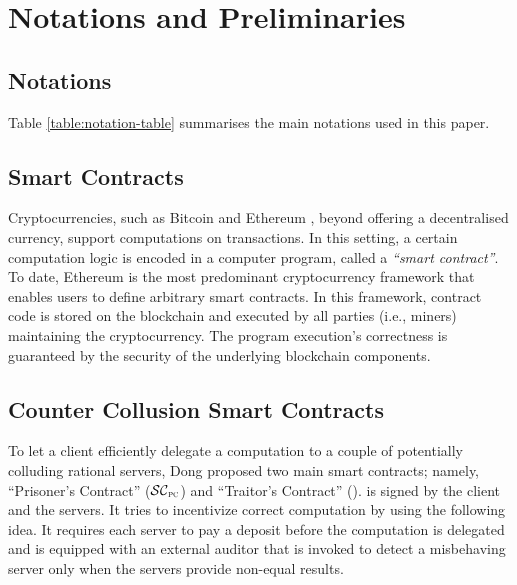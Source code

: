 

\vs
\vs
\section{Notations and Preliminaries}

\vs
\subsection{Notations}
\vspace{-2mm}
Table \ref{table:notation-table} summarises the main notations used in this paper. 

\vs
\vs
\vs


\vs
\vs




\vs 
\vs

\subsection{Smart Contracts}
\svs

Cryptocurrencies, such as Bitcoin \cite{bitcoin} and Ethereum \cite{ethereum}, beyond offering a decentralised currency,  support computations on transactions. In this setting, a certain computation logic is encoded in a computer program, called a \emph{``smart contract''}. To date, Ethereum is the most predominant cryptocurrency framework that enables users to define arbitrary smart contracts. In this framework,  contract code is stored on the blockchain and executed by all parties (i.e., miners) maintaining the cryptocurrency. The program execution's correctness is guaranteed by the security of the underlying blockchain components. %

\vs
\vs

\subsection{Counter Collusion Smart Contracts}\label{Counter-Collusion-Smart-Contracts}
\svs


To let a client efficiently delegate a computation to a  couple of potentially colluding rational servers, Dong   \et \cite{dong2017betrayal} proposed two main smart contracts; namely, ``Prisoner's Contract'' ($\SCpc$) and ``Traitor's Contract'' (\SCtc).  
%
\SCpc is signed by the client and the servers. It tries to incentivize correct computation by using the following idea. It requires each server to pay a deposit before the computation is delegated and is equipped with an external auditor that is invoked to detect a misbehaving server only when the servers provide non-equal results. 



